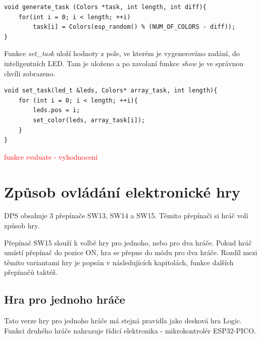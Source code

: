 \begin{minipage}{\linewidth}
\begin{lstlisting}[frame=single,numbers=right,caption={Funkce pro vygenerování zadání.},label=lst:priklad.vypis.kodu.C,basicstyle=\ttfamily\small, keywordstyle=\color{black}\bfseries\underbar,]
void generate_task (Colors *task, int length, int diff){
    for(int i = 0; i < length; ++i)
        task[i] = Colors(esp_random() % (NUM_OF_COLORS - diff));
}      
\end{lstlisting}
\end{minipage} 

Funkce {\it set\_task} uloží hodnoty z pole, ve kterém je vygenerováno zadání, do inteligentních LED. Tam je uloženo a po zavolaní funkce {\it show} je ve správnou 
chvíli zobrazeno.

\begin{minipage}{\linewidth}
\begin{lstlisting}[frame=single,numbers=right,caption={Funkce pro vygenerování zadání.},label=lst:priklad.vypis.kodu.C,basicstyle=\ttfamily\small, keywordstyle=\color{black}\bfseries\underbar,]
void set_task(led_t &leds, Colors* array_task, int length){
    for (int i = 0; i < length; ++i){
        leds.pos = i;
        set_color(leds, array_task[i]); 
    } 
}      
\end{lstlisting}
\end{minipage}

\textcolor{red}{funkce evaluate - vyhodnocení} %

\chapter{Způsob ovládání elektronické hry}
DPS obsahuje 3 přepínače SW13, SW14 a SW15. Těmito přepínači si hráč volí způsob hry.

Přepínač SW15 slouží k volbě hry pro jednoho, nebo pro dva hráče. Pokud hráč umístí přepínač do pozice ON, hra se přepne
do módu pro dva hráče. Rozdíl mezi těmito variantami hry je popsán v následujících kapitolách, funkce dalších přepínačů taktéž.

\section{Hra pro jednoho hráče}
Tato verze hry pro jednoho hráče má stejná pravidla jako desková hra Logic. Funkci druhého hráče nahrazuje řídicí elektronika
- mikrokontrolér ESP32-PICO.

